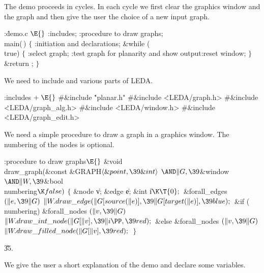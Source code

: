 The demo proceeds in cycles. In each cycle we first clear the graphics window %
 and
the graph  and then give the user the choice of a new input graph.


\Y\B\4:\.{demo.c }\X${}\E{}$\6
:includes\X;\6
:procedure to draw graphs\X;\6
\\{main}(\,)\1\1 $\{$ :initiation and declarations\X;\6
\&{while} (\\{true}) $\{$ :select graph\X;\6
:test graph for planarity and show output\X {}:reset window\X;\6
$\}$ \&{return} ; $\}{}$\par
\fi

We need to include  and various parts of LEDA.

\Y\B\4:includes\X${}\mathrel+\E{}$\6
\8\#\&{include} \.{"planar.h"}\6
\8\#\&{include} \.{<LEDA/graph.h>}\6
\8\#\&{include} \.{<LEDA/graph\_alg.h>}\6
\8\#\&{include} \.{<LEDA/window.h>}\6
\8\#\&{include} \.{<LEDA/graph\_edit.h>}\par
\fi

We need a simple procedure to draw a graph in a graphics window. The
numbering of the nodes is optional.

\Y\B\4:procedure to draw graphs\X${}\E{}$\6
\&{void} \\{draw\_graph}(\&{const} \&{GRAPH}${}\langle\&{point},\39\&{int}%
\rangle{}$ ${}{\AND}\|G,\39{}$\&{window} ${}{\AND}\|W,\39{}$\&{bool} %
\\{numbering}${}\K\\{false}){}$\1\1\2\2\6
${}\{{}$\1\6
\&{node} \|v;\6
\&{edge} \|e;\6
\&{int} \|i${}\K\T{0};{}$\7
\&{forall\_edges} ${}(\|e,\39\|G){}$\1\5
${}\|W.\\{draw\_edge}(\|G[\\{source}(\|e)],\39\|G[\\{target}(\|e)],\39%
\\{blue});{}$\2\6
\&{if} (\\{numbering})\1\6
\&{forall\_nodes} ${}(\|v,\39\|G){}$\1\5
${}\|W.\\{draw\_int\_node}(\|G[\|v],\39\|i\PP,\39\\{red});{}$\2\2\6
\&{else}\1\6
\&{forall\_nodes} ${}(\|v,\39\|G){}$\1\5
${}\|W.\\{draw\_filled\_node}(\|G[\|v],\39\\{red});{}$\2\2\6
\4${}\}{}$\2\par
\U35.\fi

We give the user a short explanation of the demo and declare some
variables.



